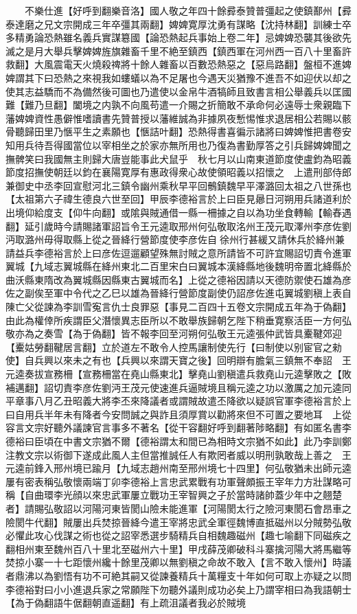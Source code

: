 　　不樂仕進【好呼到翻樂音洛】國人敬之年四十餘彛泰贊普彊起之使鎮鄯州【彛泰達磨之兄文宗開成三年卒彊其兩翻】婢婢寛厚沈勇有謀略【沈持林翻】訓練士卒多精勇論恐熱雖名義兵實謀簒國【論恐熱起兵事始上卷二年】忌婢婢恐襲其後欲先滅之是月大舉兵擊婢婢旌旗雜畜千里不絶至鎮西【鎮西軍在河州西一百八十里畜許救翻】大風震電天火燒殺禆將十餘人雜畜以百數恐熱惡之【惡烏路翻】盤桓不進婢婢謂其下曰恐熱之來視我如螻蟻以為不足屠也今遇天災猶豫不進吾不如迎伏以却之使其志益驕而不為備然後可圖也乃遣使以金帛牛酒犒師且致書言相公舉義兵以匡國難【難乃旦翻】闔境之内孰不向風苟遣一介賜之折簡敢不承命何必遠辱士衆親臨下藩婢婢資性愚僻惟嗜讀書先贊普授以藩維誠為非據夙夜慙惕惟求退居相公若賜以骸骨聽歸田里乃愜平生之素願也【愜詰叶翻】恐熱得書喜徧示諸將曰婢婢惟把書卷安知用兵待吾得國當位以宰相坐之於家亦無所用也乃復為書勤厚答之引兵歸婢婢聞之撫髀笑曰我國無主則歸大唐豈能事此犬鼠乎　秋七月以山南東道節度使盧鈞為昭義節度招撫使朝廷以鈞在襄陽寛厚有惠政得衆心故使領昭義以招懷之　上遣刑部侍郎兼御史中丞李回宣慰河北三鎮令幽州乘秋早平回鶻鎮魏早平澤潞回太祖之八世孫也【太祖第六子禕生德良六世至回】甲辰李德裕言於上曰臣見曏日河朔用兵諸道利於出境仰給度支【仰牛向翻】或隂與賊通借一縣一柵據之自以為功坐食轉輸【輸舂遇翻】延引歲時今請賜諸軍詔旨令王元逵取邢州何弘敬取洺州王茂元取澤州李彦佐劉沔取潞州毋得取縣上從之晉絳行營節度使李彦佐自徐州行甚緩又請休兵於絳州兼請益兵李德裕言於上曰彦佐逗遛顧望殊無討賊之意所請皆不可許宜賜詔切責令進軍翼城【九域志翼城縣在絳州東北二百里宋白曰翼城本漢絳縣地後魏明帝置北絳縣於曲沃縣東隋改為翼城縣因縣東古翼城而名】上從之德裕因請以天德防禦使石雄為彦佐之副俟至軍中令代之乙巳以雄為晉絳行營節度副使仍詔彦佐進屯翼城劉稹上表自陳亡父從諫為李訓雪寃言仇士良罪惡【事見二百四十五卷文宗開成五年為于偽翻】由此為權倖所疾謂臣父潛懷異志臣所以不敢舉族歸朝乞陛下稍垂寛察活臣一方何弘敬亦為之奏雪【為于偽翻】皆不報李回至河朔何弘敬王元逵張仲武皆具櫜鞬郊迎【櫜姑勞翻鞬居言翻】立於道左不敢令人控馬讓制使先行【曰制使以别宦官之勑使】自兵興以來未之有也【兵興以來謂天寶之後】回明辯有膽氣三鎮無不奉詔　王元逵奏拔宣務柵【宣務柵當在堯山縣東北】擊堯山劉稹遣兵救堯山元逵擊敗之【敗補邁翻】詔切責李彦佐劉沔王茂元使速進兵逼賊境且稱元逵之功以激厲之加元逵同平章事八月乙丑昭義大將李丕來降議者或謂賊故遣丕降欲以疑誤官軍李德裕言於上曰自用兵半年未有降者今安問誠之與詐且須厚賞以勸將來但不可置之要地耳　上從容言文宗好聽外議諫官言事多不著名【從干容翻好呼到翻著陟略翻】有如匿名書李德裕曰臣頃在中書文宗猶不爾【德裕謂太和間已為相時文宗猶不如此】此乃李訓鄭注教文宗以術御下遂成此風人主但當推誠任人有欺罔者威以明刑孰敢哉上善之　王元逵前鋒入邢州境已踰月【九域志趙州南至邢州境七十四里】何弘敬猶未出師元逵屢有密表稱弘敬懷兩端丁卯李德裕上言忠武累戰有功軍聲頗振王宰年力方壯謀略可稱【自曲環李光顔以來忠武軍屢立戰功王宰智興之子於當時諸帥蓋少年中之翹楚者】請賜弘敬詔以河陽河東皆閡山險未能進軍【河陽閡太行之險河東閡石會昂車之險閡牛代翻】賊屢出兵焚掠晉絳今遣王宰將忠武全軍徑魏博直抵磁州以分賊勢弘敬必懼此攻心伐謀之術也從之詔宰悉選步騎精兵自相魏趣磁州【趣七喻翻下同磁疾之翻相州東至魏州百八十里北至磁州六十里】甲戌薛茂卿破科斗寨擒河陽大將馬繼等焚掠小寨一十七距懷州纔十餘里茂卿以無劉稹之命故不敢入【言不敢入懷州】時議者鼎沸以為劉悟有功不可絶其嗣又從諫養精兵十萬糧支十年如何可取上亦疑之以問李德裕對曰小小進退兵家之常願陛下勿聽外議則成功必矣上乃謂宰相曰為我語朝士【為于偽翻語牛倨翻朝直遥翻】有上疏沮議者我必於賊境